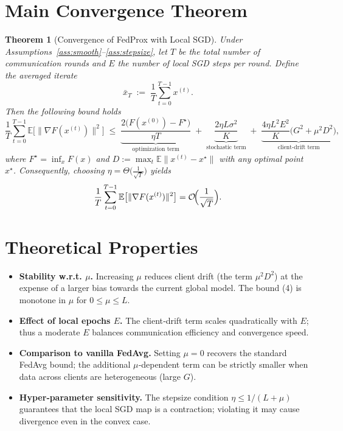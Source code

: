 \documentclass[11pt]{article}
\newtheorem{theorem}{Theorem}
\newcommand{\E}{\mathbb{E}}
\begin{document}
\section*{Main Convergence Theorem}
\begin{theorem}[Convergence of FedProx with Local SGD]\label{thm:main}
Under Assumptions~\ref{ass:smooth}–\ref{ass:stepsize}, let $T$ be the total number of communication rounds and $E$ the number of local SGD steps per round.  
Define the averaged iterate
\[
\bar{x}_T \;:=\; \frac{1}{T}\sum_{t=0}^{T-1} x^{(t)} .
\]
Then the following bound holds
\[
\frac{1}{T}\sum_{t=0}^{T-1}\E\bigl[\|\nabla F(x^{(t)})\|^2\bigr]
\;\le\;
\underbrace{\frac{2\bigl(F(x^{(0)})-F^\star\bigr)}{\eta T}}_{\text{optimization term}}
\;+\;
\underbrace{ \frac{2\eta L\sigma^2}{K} }_{\text{stochastic term}}
\;+\;
\underbrace{ \frac{4\eta L^2 E^2}{K}\bigl(G^2+\mu^2 D^2\bigr)}_{\text{client‑drift term}},
\tag{4}
\]
where $F^\star=\inf_x F(x)$ and $D:=\max_{t}\E\|x^{(t)}-x^{\star}\|$ with any optimal point $x^{\star}$.
Consequently, choosing $\eta = \Theta\bigl(\frac{1}{\sqrt{T}}\bigr)$ yields
\[
\frac{1}{T}\sum_{t=0}^{T-1}\E\bigl[\|\nabla F(x^{(t)})\|^2\bigr]=
\mathcal{O}\!\Bigl(\frac{1}{\sqrt{T}}\Bigr).
\]
\end{theorem}

\section*{Theoretical Properties}
\begin{itemize}
\item \textbf{Stability w.r.t. $\mu$.} Increasing $\mu$ reduces client drift (the term $ \mu^2 D^2$) at the expense of a larger bias towards the current global model. The bound (4) is monotone in $\mu$ for $0\le\mu\le L$.
\item \textbf{Effect of local epochs $E$.} The client‑drift term scales quadratically with $E$; thus a moderate $E$ balances communication efficiency and convergence speed.
\item \textbf{Comparison to vanilla FedAvg.} Setting $\mu=0$ recovers the standard FedAvg bound; the additional $\mu$‑dependent term can be strictly smaller when data across clients are heterogeneous (large $G$).
\item \textbf{Hyper‑parameter sensitivity.} The stepsize condition $\eta\le 1/(L+\mu)$ guarantees that the local SGD map is a contraction; violating it may cause divergence even in the convex case.
\end{itemize}
\end{document}
